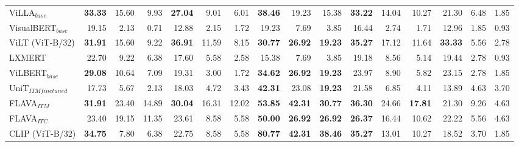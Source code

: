 \begin{table}[ht]
\begin{adjustbox}{max width=\textwidth}
\begin{tabular}{l|rrr|rrr|rrr|rrr|rrr}
 ViLLA$_{base}$               & \textbf{33.33} & 15.60          & 9.93           & \textbf{27.04} & 9.01           & 6.01           & \textbf{38.46} & 19.23          & 15.38          & \textbf{33.22} & 14.04          & 10.27          & 21.30          & 6.48           & 1.85           \\
 VisualBERT$_{base}$          & 19.15          & 2.13           & 0.71           & 12.88          & 2.15           & 1.72           & 19.23          & 7.69           & 3.85           & 16.44          & 2.74           & 1.71           & 12.96          & 1.85           & 0.93           \\
 ViLT (ViT-B/32)              & \textbf{31.91} & 15.60          & 9.22           & \textbf{36.91} & 11.59          & 8.15           & \textbf{30.77} & \textbf{26.92} & \textbf{19.23} & \textbf{35.27} & 17.12          & 11.64          & \textbf{33.33} & 5.56           & 2.78           \\
 LXMERT                       & 22.70          & 9.22           & 6.38           & 17.60          & 5.58           & 2.58           & 15.38          & 7.69           & 3.85           & 19.18          & 8.56           & 5.14           & 19.44          & 2.78           & 0.93           \\
 ViLBERT$_{base}$             & \textbf{29.08} & 10.64          & 7.09           & 19.31          & 3.00           & 1.72           & \textbf{34.62} & \textbf{26.92} & \textbf{19.23} & 23.97          & 8.90           & 5.82           & 23.15          & 2.78           & 1.85           \\
 UniT$_{ITM finetuned}$       & 17.73          & 5.67           & 2.13           & 18.03          & 4.72           & 3.43           & \textbf{42.31} & 23.08          & \textbf{19.23} & 21.58          & 6.85           & 4.11           & 13.89          & 4.63           & 3.70           \\
  FLAVA$_{ITM}$                & \textbf{31.91} & 23.40 & 14.89 & \textbf{30.04} & 16.31 & 12.02 & \textbf{53.85} & \textbf{42.31} & \textbf{30.77} & \textbf{36.30} & 24.66 & \textbf{17.81} & 21.30          & 9.26 & 4.63 \\
 FLAVA$_{ITC}$        & 23.40          & 19.15 & 11.35 & 23.61          &  8.58 &  5.58 & \textbf{50.00} & \textbf{26.92} & \textbf{26.92} & \textbf{26.37} & 16.44 & 10.62          & 22.22          &  5.56 & 4.63 \\
 CLIP (ViT-B/32)              & \textbf{34.75} & 7.80           & 6.38           & 22.75          & 8.58           & 5.58           & \textbf{80.77} & \textbf{42.31} & \textbf{38.46} & \textbf{35.27} & 13.01          & 10.27          & 18.52          & 3.70           & 1.85           \\

\end{tabular}
\end{adjustbox}
\end{table}
